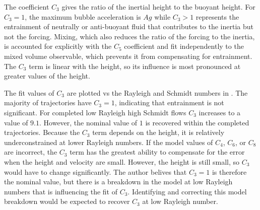 The coefficient $C_3$ gives the ratio of the inertial height to the buoyant height.
For $C_3 = 1$, the maximum bubble acceleration is $A g$ while $C_3 > 1$ represents the entrainment of neutrally or anti-buoyant fluid that contributes to the inertia but not the forcing.
Mixing, which also reduces the ratio of the forcing to the inertia, is accounted for explicitly with the $C_5$ coefficient and fit independently to the mixed volume observable, which prevents it from compensating for entrainment.
The $C_3$ term is linear with the height, so its influence is most pronounced at greater values of the height.

The fit values of $C_3$ are plotted vs the Rayleigh and Schmidt numbers in .
The majority of trajectories have $C_3 = 1$, indicating that entrainment is not significant.
For completed low Rayleigh high Schmidt flows $C_3$ increases to a value of $9.1$.
However, the nominal value of $1$ is recovered within the completed trajectories.
Because the $C_3$ term depends on the height, it is relatively underconstrained at lower Rayleigh numbers.
If the model values of $C_4$, $C_6$, or $C_8$ are incorrect, the $C_3$ term has the greatest ability to compensate for the error when the height and velocity are small.
However, the height is still small, so $C_3$ would have to change significantly.
The author belives that $C_3 = 1$ is therefore the nominal value, but there is a breakdown in the model at low Rayleigh numbers that is influencing the fit of $C_3$.
Identifying and correcting this model breakdown would be expected to recover $C_3$ at low Rayleigh number.

